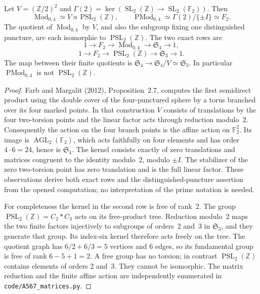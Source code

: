 \begin{proposition}
\label{A:four-puncture-MCG}
Let $V=(\mathbb Z/2)^2$ and
$\Gamma(2)=\ker(\operatorname{SL}_2(\mathbb Z)\to
\operatorname{SL}_2(\mathbb F_2))$. Then
\[
 \operatorname{Mod}_{0,4}\simeq
 V\rtimes\operatorname{PSL}_2(\mathbb Z),\qquad
 \operatorname{PMod}_{0,4}\simeq
 \Gamma(2)/\{\pm I\}\simeq F_2.
\]
The quotient of $\operatorname{Mod}_{0,4}$ by $V$, and also the
subgroup fixing one distinguished puncture, are each isomorphic to
$\operatorname{PSL}_2(\mathbb Z)$. The two exact rows are
\[
 1\longrightarrow F_2\longrightarrow\operatorname{Mod}_{0,4}
 \longrightarrow\mathfrak S_4\longrightarrow1,
\]
\[
 1\longrightarrow F_2\longrightarrow\operatorname{PSL}_2(\mathbb Z)
 \longrightarrow\mathfrak S_3\longrightarrow1.
\]
The map between their finite quotients is
$\mathfrak S_4\to\mathfrak S_4/V\simeq\mathfrak S_3$.
In particular $\operatorname{PMod}_{0,4}$ is not
$\operatorname{PSL}_2(\mathbb Z)$.
\end{proposition}

\begin{proof}
Farb and Margalit (2012), Proposition~2.7, computes the first
semidirect product using the double cover of the four-punctured
sphere by a torus branched over its four marked points. In that
construction $V$ consists of translations by the four two-torsion
points and the linear factor acts through reduction modulo~2.
Consequently the action on the four branch points is the affine
action on $\mathbb F_2^2$. Its image is
$\operatorname{AGL}_2(\mathbb F_2)$, which acts faithfully on
four elements and has order $4\cdot6=24$, hence is
$\mathfrak S_4$. The kernel consists exactly of zero translations
and matrices congruent to the identity modulo~2, modulo $\pm I$.
The stabilizer of the zero two-torsion point has zero translation
and is the full linear factor. These observations derive both
exact rows and the distinguished-puncture assertion from the
opened computation; no interpretation of the prime notation is
needed.

For completeness the kernel in the second row is free of rank~2.
The group $\operatorname{PSL}_2(\mathbb Z)=C_2*C_3$ acts on
its free-product tree. Reduction modulo~2 maps the two finite
factors injectively to subgroups of orders~2 and~3 in
$\mathfrak S_3$, and they generate that group. Its index-six
kernel therefore acts freely on the tree. The quotient graph has
$6/2+6/3=5$ vertices and $6$ edges, so its fundamental group is
free of rank $6-5+1=2$. A free group has no torsion; in contrast
$\operatorname{PSL}_2(\mathbb Z)$ contains elements of orders
2 and~3. They cannot be isomorphic. The matrix reduction and the
finite affine action are independently enumerated in
\texttt{code/A567\_matrices.py}.
\end{proof}

